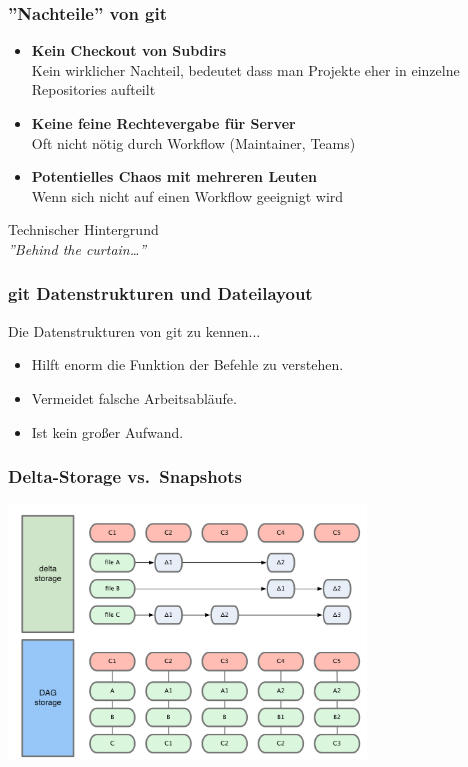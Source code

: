 \begin{frame}
  \frametitle{''Nachteile'' von git}
  \begin{itemize}
    \pause
    \item {\bf Kein Checkout von Subdirs} \\ Kein wirklicher Nachteil, bedeutet dass man Projekte eher in einzelne Repositories aufteilt
    \pause
    \item {\bf Keine feine Rechtevergabe für Server} \\ Oft nicht nötig durch Workflow (Maintainer, Teams)
    \pause
    \item {\bf Potentielles Chaos mit mehreren Leuten} \\ Wenn sich nicht auf einen Workflow geeignigt wird
  \end{itemize}
\end{frame}

\begin{frame}
  \begin{center}
  \Huge Technischer Hintergrund \\
  \small {\it ''Behind the curtain\ldots''}
  \end{center}
\end{frame}

\begin{frame}
  \frametitle{git Datenstrukturen und Dateilayout}
  \begin{block}{Die Datenstrukturen von git zu kennen...}
    \begin{itemize}
      \item Hilft enorm die Funktion der Befehle zu verstehen.
      \item Vermeidet falsche Arbeitsabläufe.
      \item Ist kein großer Aufwand.
    \end{itemize}
  \end{block}
\end{frame}

\begin{frame}
  \frametitle{Delta-Storage vs.\ Snapshots}
  \begin{center}
    \includegraphics[width=9.5cm]{img/delta_storage.pdf}
  \end{center}
\end{frame}

